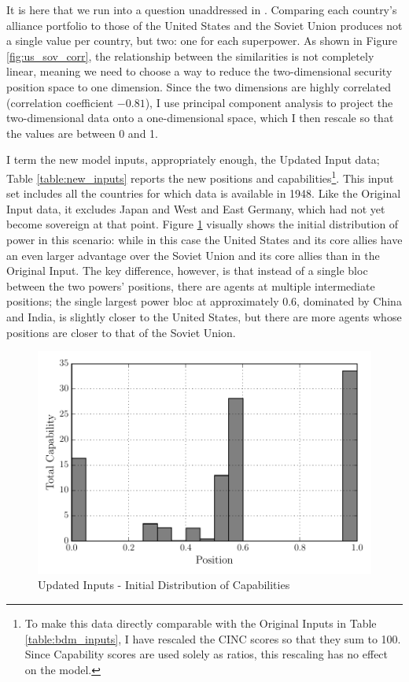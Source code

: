 It is here that we run into a question unaddressed in \citet{bdm_1998}. Comparing each country's alliance portfolio to those of the United States and the Soviet Union produces not a single value per country, but two: one for each superpower. As shown in Figure \ref{fig:us_sov_corr}, the relationship between the similarities is not completely linear, meaning we need to choose a way to reduce the two-dimensional security position space to one dimension. Since the two dimensions are highly correlated (correlation coefficient $-0.81$), I use principal component analysis \citep{tipping_1999} to project the two-dimensional data onto a one-dimensional space, which I then rescale so that the values are between 0 and 1.

I term the new model inputs, appropriately enough, the Updated Input data; Table \ref{table:new_inputs} reports the new positions and capabilities\footnote{To make this data directly comparable with the Original Inputs in Table \ref{table:bdm_inputs}, I have rescaled the CINC scores so that they sum to 100. Since Capability scores are used solely as ratios, this rescaling has no effect on the model.}. This input set includes all the countries for which data is available in 1948. Like the Original Input data, it excludes Japan and West and East Germany, which had not yet become sovereign at that point. 
Figure \ref{fig:updated_input_hist} visually shows the initial distribution of power in this scenario: while in this case the United States and its core allies have an even larger advantage over the Soviet Union and its core allies than in the Original Input. The key difference, however, is that instead of a single bloc between the two powers' positions, there are agents at multiple intermediate positions; the single largest power bloc at approximately 0.6, dominated by China and India, is slightly closer to the United States, but there are more agents whose positions are closer to that of the Soviet Union.

\begin{figure}[h!]
  \centering
  \includegraphics[scale=0.75]{ColdWar/Figures/Updated_Inputs_hist}
  \caption[Updated Inputs]{Updated Inputs - Initial Distribution of Capabilities}
  \label{fig:updated_input_hist}
  \figSpace
 \end{figure}

